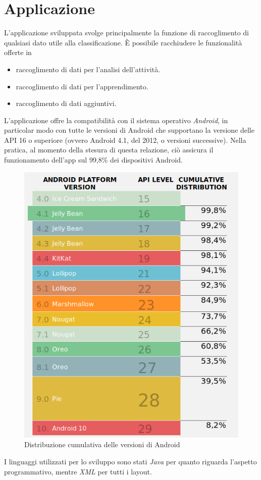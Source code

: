 \chapter{Applicazione}
\label{chapter:app}
L'applicazione sviluppata svolge principalmente la funzione di raccoglimento di qualsiasi dato utile alla classificazione.
È possibile racchiudere le funzionalità offerte in
\begin{itemize}
    \item raccoglimento di dati per l'analisi dell'attività.
    \item raccoglimento di dati per l'apprendimento.
    \item raccoglimento di dati aggiuntivi.
\end{itemize}
L'applicazione offre la compatibilità con il sistema operativo \textit{Android}, in particolar modo con tutte le versioni di Android che supportano la 
versione delle API 16 o superiore (ovvero Android 4.1, del 2012, o versioni successive). 
Nella pratica, al momento della stesura di questa relazione, ciò assicura il funzionamento dell'app sul 99,8\% dei dispositivi Android.
\begin{figure}[H]
    \centering
    \includegraphics[scale = 0.45]{assets/images/android/compatibility.png}
    \caption{Distribuzione cumulativa delle versioni di Android}
    \label{fig:android-compatibility}
\end{figure}
I linguaggi utilizzati per lo sviluppo sono stati \textit{Java} per quanto riguarda l'aspetto programmativo, mentre \textit{XML} per tutti i
layout.



